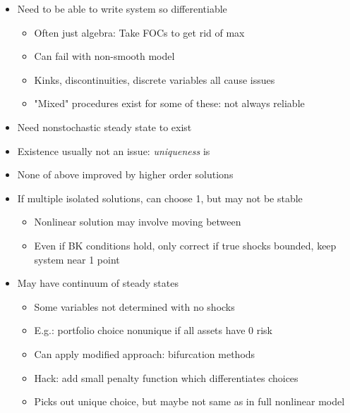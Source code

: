 \documentclass[bigger,handout]{beamer}
\begin{document}
\begin{frame}

\begin{itemize}

\item Need to be able to write system so differentiable
\begin{itemize}
    \item Often just algebra: Take FOCs to get rid of max
    \item Can fail with non-smooth model 
    \item Kinks, discontinuities, discrete variables all cause issues
    \item "Mixed" procedures exist for some of these: not always reliable
\end{itemize}  
\item Need nonstochastic steady state to exist
\item Existence usually not an issue: \emph{uniqueness} is
\item None of above improved by higher order solutions



\end{itemize}

\end{frame}%


\begin{frame}

\begin{itemize}
\item If multiple isolated solutions, can choose 1, but may not be stable
  \begin{itemize}
  \item Nonlinear solution may involve moving between
  \item Even if BK conditions hold, only correct if true shocks bounded, keep system near 1 point
  \end{itemize}
  
\item May have continuum of steady states
\begin{itemize}
    \item Some variables not determined with no shocks
    \item E.g.: portfolio choice nonunique if all assets have 0 risk
    \item Can apply modified approach: bifurcation methods
    \item Hack: add small penalty function which differentiates choices
    \item Picks out unique choice, but maybe not same as in full nonlinear model 
\end{itemize}    

\end{itemize}

\end{frame}%
\end{document}
